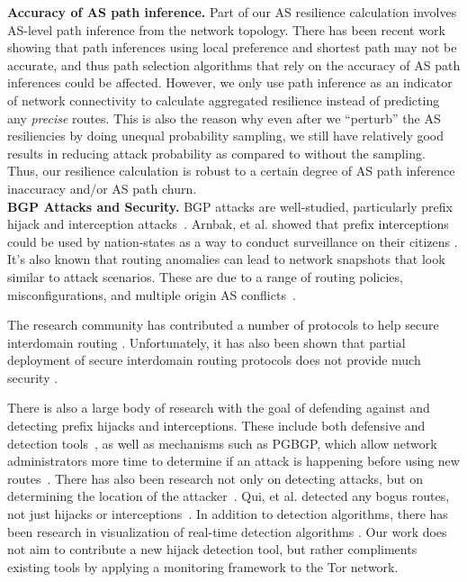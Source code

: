 {\bf Accuracy of AS path inference.}  
Part of our AS resilience calculation involves AS-level path inference from the network topology. There has been recent work  showing that path inferences using local preference and shortest path may not be accurate, and thus path selection algorithms  that rely on the accuracy of AS path inferences could be affected. However, we only use path inference as an indicator of network connectivity to calculate aggregated resilience instead of predicting any \emph{precise} routes. This is also the reason why even after we ``perturb'' the AS resiliencies by doing unequal probability sampling, we still have relatively good results in reducing attack probability as compared to without the sampling. Thus, our resilience calculation is robust to a certain degree of AS path inference inaccuracy and/or AS path churn. 
\\
{\bf BGP Attacks and Security.}
BGP attacks are well-studied, particularly prefix hijack and interception attacks~\cite{ballani2007study, mcarthur2009stealthy, zhang2012studying}.  Arnbak, et al. showed that prefix interceptions could be used by nation-states as a way to conduct surveillance on their citizens \cite{arnbak2014loopholes}.  It's also known that routing anomalies can lead to network snapshots that look similar to attack scenarios.  These are due to a range of routing policies, misconfigurations, and multiple origin AS conflicts~\cite{caesar2005bgp, mahajan2002understanding, zhao2001analysis}.  

The research community has contributed a number of protocols to help secure interdomain routing \cite{boldyreva2012provable, chan2006modeling, gill2011let, hu2004spv, zhang2009hc, van2007interdomain}.  Unfortunately, it has also been shown that partial deployment of secure interdomain routing protocols does not provide much security \cite{lychev2013bgp}.

There is also a large body of research with the goal of defending against and detecting prefix hijacks and interceptions.  These include both defensive and detection tools~\cite{lad2006phas, hu2007accurate, shi2012detecting, zhang2008ispy, zheng2007light, sriram2009comparative, zhang2007practical}, as well as mechanisms such as PGBGP, which allow network administrators more time to determine if an attack is happening before using new routes~\cite{karlin2006pretty}.  There has also been research not only on detecting attacks, but on determining the location of the attacker~\cite{qiu2009locating}.  Qui, et al. detected any bogus routes, not just hijacks or interceptions~\cite{qiu2007detecting}.  In addition to detection algorithms, there has been research in visualization of real-time detection algorithms \cite{teoh2006bgp}.  Our work does not aim to contribute a new hijack detection tool, but rather compliments existing tools by applying a monitoring framework to the Tor network. 



